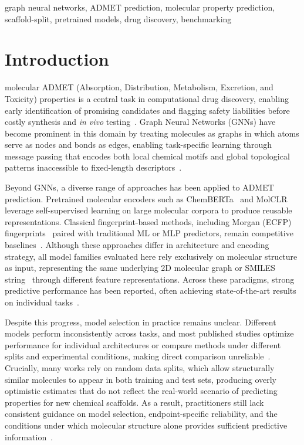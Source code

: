 \documentclass[journal]{IEEEtran}
\begin{document}
\begin{IEEEkeywords}
graph neural networks, ADMET prediction, molecular property prediction, scaffold-split, pretrained models, drug discovery, benchmarking
\end{IEEEkeywords}


\section{Introduction}
\label{sec:intro}

 molecular ADMET (Absorption, Distribution, Metabolism, Excretion, and Toxicity) properties is a central task in computational drug discovery, enabling early identification of promising candidates and flagging safety liabilities before costly synthesis and \emph{in vivo} testing~\cite{zhang2025admet}. Graph Neural Networks (GNNs) have become prominent in this domain by treating molecules as graphs in which atoms serve as nodes and bonds as edges, enabling task-specific learning through message passing that encodes both local chemical motifs and global topological patterns inaccessible to fixed-length descriptors~\cite{gilmer2017neural, yang2019dmpnn, attentiveFP}.

Beyond GNNs, a diverse range of approaches has been applied to ADMET prediction. Pretrained molecular encoders such as ChemBERTa~\cite{chemberta2} and MolCLR~\cite{molclr} leverage self-supervised learning on large molecular corpora to produce reusable representations. Classical fingerprint-based methods, including Morgan (ECFP) fingerprints~\cite{rogers2010ecfp} paired with traditional ML or MLP predictors, remain competitive baselines~\cite{maplight, rdkit2d_mlp}. Although these approaches differ in architecture and encoding strategy, all model families evaluated here rely exclusively on molecular structure as input, representing the same underlying 2D molecular graph or SMILES string~\cite{weininger1988smiles} through different feature representations. Across these paradigms, strong predictive performance has been reported, often achieving state-of-the-art results on individual tasks~\cite{huang2021therapeuticsdatacommonsmachine}.

Despite this progress, model selection in practice remains unclear. Different models perform inconsistently across tasks, and most published studies optimize performance for individual architectures or compare methods under different splits and experimental conditions, making direct comparison unreliable~\cite{wu2018moleculenet, yang2019dmpnn}. Crucially, many works rely on random data splits, which allow structurally similar molecules to appear in both training and test sets, producing overly optimistic estimates that do not reflect the real-world scenario of predicting properties for new chemical scaffolds. As a result, practitioners still lack consistent guidance on model selection, endpoint-specific reliability, and the conditions under which molecular structure alone provides sufficient predictive information~\cite{wu2018moleculenet, huang2021therapeuticsdatacommonsmachine}.
\end{document}
